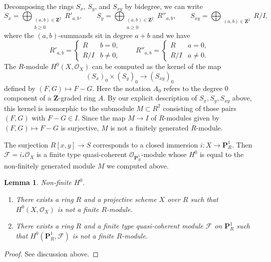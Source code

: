 \documentclass[10pt,a4paper]{amsart}
\theoremstyle{plain}
\newtheorem{lemma}[subsection]{Lemma}
\theoremstyle{definition}
\theoremstyle{remark}
\numberwithin{equation}{subsection}
\begin{document}
\medskip\noindent
Decomposing the rings $S_x$, $S_y$, and $S_{xy}$ by bidegree,
we can write
$$
S_x = \bigoplus_{\substack{(a, b) \in \mathbf{Z}^2 \\ b \geq 0}} R'_{a, b},
\quad\quad
S_y = \bigoplus_{\substack{(a, b) \in \mathbf{Z}^2 \\ a \geq 0}} R''_{a, b},
\quad\quad
S_{xy} = \bigoplus_{\substack{(a, b) \in \mathbf{Z}^2}} R/I,
$$
where the $(a, b)$-summands sit in degree $a + b$ and we have
$$
R'_{a, b} =
\left\{
\begin{matrix}
R & b = 0, \\
R/I & b \ne 0,
\end{matrix}
\right.
\quad\quad
R''_{a, b} =
\left\{
\begin{matrix}
R & a = 0, \\
R/I & a \ne 0.
\end{matrix}
\right.
$$
The $R$-module $H^0(X, \mathcal{O}_X)$ can be computed as the kernel of the map
$$
(S_x)_0 \times (S_y)_0 \to (S_{xy})_0
$$
defined by $(F, G) \mapsto F - G$. Here the notation $A_0$ refers to the
degree $0$ component of a $\mathbf{Z}$-graded ring $A$. By our explicit
description of $S_x, S_y, S_{xy}$ above, this kernel is isomorphic
to the submodule $M \subset R^2$ consisting of those pairs $(F, G)$
with $F - G \in I$. Since the map $M \to I$ of $R$-modules
given by $(F, G) \mapsto F - G$ is surjective,
$M$ is not a finitely generated $R$-module.

\medskip\noindent
The surjection $R[x, y] \to S$ corresponds to a closed
immersion $i : X \to \mathbf{P}^1_R$. Then $\mathcal{F} = i_*\mathcal{O}_X$
is a finite type quasi-coherent $\mathcal{O}_{\mathbf{P}^1_R}$-module
whose $H^0$ is equal to the non-finitely generated module $M$
we computed above.

\begin{lemma}
\label{lemma-nonfinite-h0}
Non-finite $H^0$.
\begin{enumerate}
\item There exists a ring $R$ and a projective scheme $X$
over $R$ such that $H^0(X, \mathcal{O}_X)$ is not
a finite $R$-module.
\item There exists a ring $R$ and a finite type quasi-coherent module
$\mathcal{F}$ on $\mathbf{P}^1_R$ such that
$H^0(\mathbf{P}^1_R, \mathcal{F})$ is not a finite $R$-module.
\end{enumerate}
\end{lemma}

\begin{proof}
See discussion above.
\end{proof}
\end{document}

